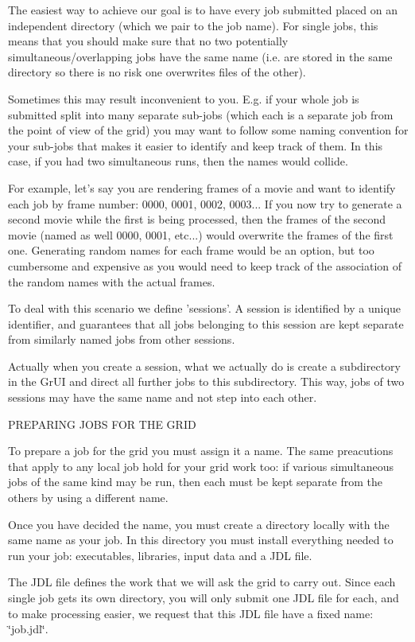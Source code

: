 The easiest way to achieve our goal is to have every job submitted placed on an independent directory (which we pair to the job name). For single jobs, this means that you should make sure that no two potentially simultaneous/overlapping jobs have the same name (i.e. are stored in the same directory so there is no risk one overwrites files of the other).

Sometimes this may result inconvenient to you. E.g. if your whole job is submitted split into many separate sub-jobs (which each is a separate job from the point of view of the grid) you may want to follow some naming convention for your sub-jobs that makes it easier to identify and keep track of them. In this case, if you had two simultaneous runs, then the names would collide.

For example, let's say you are rendering frames of a movie and want to identify each job by frame number: 0000, 0001, 0002, 0003... If you now try to generate a second movie while the first is being processed, then the frames of the second movie (named as well 0000, 0001, etc...) would overwrite the frames of the first one. Generating random names for each frame would be an option, but too cumbersome and expensive as you would need to keep track of the association of the random names with the actual frames.

To deal with this scenario we define 'sessions'. A session is identified by a unique identifier, and guarantees that all jobs belonging to this session are kept separate from similarly named jobs from other sessions.

Actually when you create a session, what we actually do is create a subdirectory in the Gr\-UI and direct all further jobs to this subdirectory. This way, jobs of two sessions may have the same name and not step into each other.

PREPARING JOBS FOR THE GRID

To prepare a job for the grid you must assign it a name. The same preacutions that apply to any local job hold for your grid work too: if various simultaneous jobs of the same kind may be run, then each must be kept separate from the others by using a different name.

Once you have decided the name, you must create a directory locally with the same name as your job. In this directory you must install everything needed to run your job: executables, libraries, input data and a JDL file.

The JDL file defines the work that we will ask the grid to carry out. Since each single job gets its own directory, you will only submit one JDL file for each, and to make processing easier, we request that this JDL file have a fixed name: \char`\"{}job.jdl\char`\"{}.

